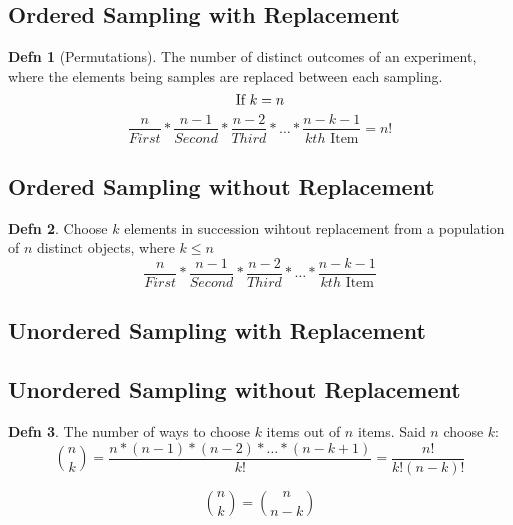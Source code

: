 \documentclass[10pt,letterpaper,final,twoside,notitlepage]{article}
\theoremstyle{plain}
\theoremstyle{definition}
\newtheorem{definition}{Defn}
\theoremstyle{remark}
\begin{document}
	\subsection[Permutations]{Ordered Sampling with Replacement} \label{subsec:Ordered Sampling with Replacement} \label{subsec:Permutations}
		\begin{definition}[Permutations] \label{def:Ordered Sampling with Replacement}
			The number of distinct outcomes of an experiment, where the elements being samples are replaced between each sampling.
			\begin{equation*}
				\text{If } k = n \\
			\end{equation*}
			\begin{equation} \label{eq:Ordered Sampling with Replacement}
				\frac{n}{First} * \frac{n-1}{Second} * \frac{n-2}{Third} * \ldots * \frac{n-k-1}{kth \text{ Item}} = n!
			\end{equation}
		\end{definition}
	\subsection{Ordered Sampling without Replacement} \label{subsec:Ordered Sampling without Replacement}
		\begin{definition} \label{def:Ordered Sampling without Replacement}
			Choose $k$ elements in succession wihtout replacement from a population of $n$ distinct objects, where $k \leq n$
			\begin{equation} \label{eq:Ordered Sampling without Replacement}
				\frac{n}{First} * \frac{n-1}{Second} * \frac{n-2}{Third} * \ldots * \frac{n-k-1}{kth \text{ Item}}
			\end{equation}
		\end{definition}
	\subsection{Unordered Sampling with Replacement} \label{subsec:Unordered Sampling with Replacement}
		
	\subsection{Unordered Sampling without Replacement} \label{subsec:Unordered Sampling without Replacement}		
		\begin{definition} \label{def:Unordered Sampling with Replacement}
			The number of ways to choose $k$ items out of $n$ items.
			Said $n$ choose $k$:
			\begin{equation} \label{eq:Unordered Sampling with Replacement}
			\binom{n}{k} = \frac{n * (n-1) * (n-2) * \ldots * (n-k+1)}{k!} = \frac{n!}{k! \left( n-k \right)!}
			\end{equation}
		\end{definition}
		\begin{equation}
			\binom{n}{k} = \binom{n}{n-k}
		\end{equation}
		
\end{document}
